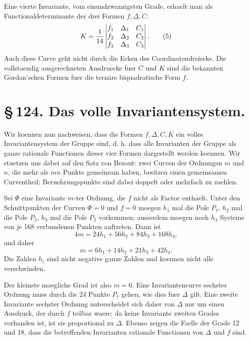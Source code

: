 \documentclass[11pt]{article}
\begin{document}
Eine vierte Invariante, vom einundzwanzigsten Grade, erhaelt man als Functionaldeterminante der drei Formen \(f,\Delta,C\):
\begin{equation}
K={1\over14}
\begin{vmatrix}
f_1&\Delta_1&C_1\\
f_2&\Delta_2&C_2\\
f_3&\Delta_3&C_3
\end{vmatrix}.
\tag{5}
\end{equation}
Auch diese Curve geht nicht durch die Ecken des Coordinatendreiecks. Die vollstaendig ausgerechneten Ausdruecke fuer \(C\) und \(K\) sind die bekannten Gordan'schen Formen fuer die ternäre biquadratische Form \(f\).

\section*{\S\,124. Das volle Invariantensystem.}

Wir koennen nun nachweisen, dass die Formen \(f,\Delta,C,K\) ein volles Invariantensystem der Gruppe sind, d. h. dass alle Invarianten der Gruppe als ganze rationale Functionen dieser vier Formen dargestellt werden koennen. Wir stuetzen uns dabei auf den Satz von Bezout: zwei Curven der Ordnungen \(m\) und \(n\), die mehr als \(mn\) Punkte gemeinsam haben, besitzen einen gemeinsamen Curventheil; Beruehrungspunkte sind dabei doppelt oder mehrfach zu zaehlen.

Sei \(\Phi\) eine Invariante \(m\)-ter Ordnung, die \(f\) nicht als Factor enthaelt. Unter den Schnittpunkten der Curven \(\Phi=0\) und \(f=0\) moegen \(h_1\) mal die Pole \(P_7\), \(h_2\) mal die Pole \(P_3\), \(h_3\) mal die Pole \(P_2\) vorkommen; ausserdem moegen noch \(h_4\) Systeme von je 168 verbundenen Punkten auftreten. Dann ist
\begin{equation}
4m=24h_1+56h_2+84h_3+168h_4,
\end{equation}
und daher
\begin{equation}
m=6h_1+14h_2+21h_3+42h_4.
\tag{1}
\end{equation}
Die Zahlen \(h_i\) sind nicht negative ganze Zahlen und koennen nicht alle verschwinden.

Der kleinste moegliche Grad ist also \(m=6\). Eine Invariantencurve sechster Ordnung muss durch die 24 Punkte \(P_7\) gehen, wie dies fuer \(\Delta\) gilt. Eine zweite Invariante sechster Ordnung unterscheidet sich daher von \(\Delta\) nur um einen Ausdruck, der durch \(f\) teilbar waere; da keine Invariante zweiten Grades vorhanden ist, ist sie proportional zu \(\Delta\). Ebenso zeigen die Faelle der Grade 12 und 18, dass die betreffenden Invarianten rationale Functionen von \(\Delta\) und \(f\) sind.
\end{document}
